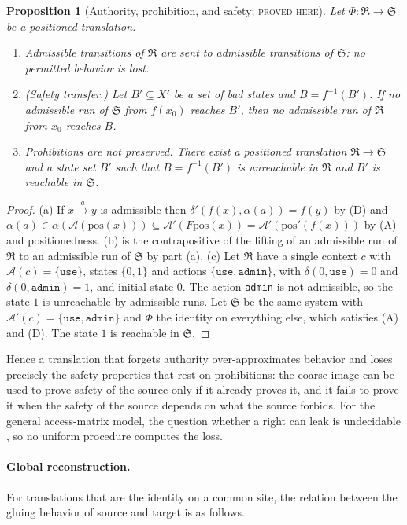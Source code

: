 \documentclass[11pt]{article}
\newtheorem{proposition}[theorem]{Proposition}
\theoremstyle{definition}
\theoremstyle{remark}
\newcommand{\stN}{\textsc{proved here}}
\newcommand{\cA}{\mathcal A}
\newcommand{\fR}{\mathfrak R}
\newcommand{\fS}{\mathfrak S}
\begin{document}
\begin{proposition}[Authority, prohibition, and safety; \stN]\label{prop:authority}
Let $\Phi:\fR\to\fS$ be a positioned translation.
\begin{enumerate}[label=(\alph*)]
\item Admissible transitions of $\fR$ are sent to admissible transitions of $\fS$: no permitted behavior is lost.
\item (Safety transfer.) Let $B'\subseteq X'$ be a set of bad states and $B=f^{-1}(B')$. If no admissible run of $\fS$ from $f(x_0)$ reaches $B'$, then no admissible run of $\fR$ from $x_0$ reaches $B$.
\item Prohibitions are not preserved. There exist a positioned translation $\fR\to\fS$ and a state set $B'$ such that $B=f^{-1}(B')$ is unreachable in $\fR$ and $B'$ is reachable in $\fS$.
\end{enumerate}
\end{proposition}
\begin{proof}
(a) If $x\xrightarrow{a}y$ is admissible then $\delta'(f(x),\alpha(a))=f(y)$ by (D) and $\alpha(a)\in\alpha(\cA(\mathrm{pos}(x)))\subseteq\cA'(F\mathrm{pos}(x))=\cA'(\mathrm{pos}'(f(x)))$ by (A) and positionedness. (b) is the contrapositive of the lifting of an admissible run of $\fR$ to an admissible run of $\fS$ by part (a). (c) Let $\fR$ have a single context $c$ with $\cA(c)=\{\texttt{use}\}$, states $\{0,1\}$ and actions $\{\texttt{use},\texttt{admin}\}$, with $\delta(0,\texttt{use})=0$ and $\delta(0,\texttt{admin})=1$, and initial state $0$. The action \texttt{admin} is not admissible, so the state $1$ is unreachable by admissible runs. Let $\fS$ be the same system with $\cA'(c)=\{\texttt{use},\texttt{admin}\}$ and $\Phi$ the identity on everything else, which satisfies (A) and (D). The state $1$ is reachable in $\fS$.
\end{proof}

Hence a translation that forgets authority over-approximates behavior and loses precisely the safety properties that rest on prohibitions: the coarse image can be used to prove safety of the source only if it already proves it, and it fails to prove it when the safety of the source depends on what the source forbids. For the general access-matrix model, the question whether a right can leak is undecidable \cite{hru}, so no uniform procedure computes the loss.

\paragraph{Global reconstruction.} For translations that are the identity on a common site, the relation between the gluing behavior of source and target is as follows.
\end{document}

